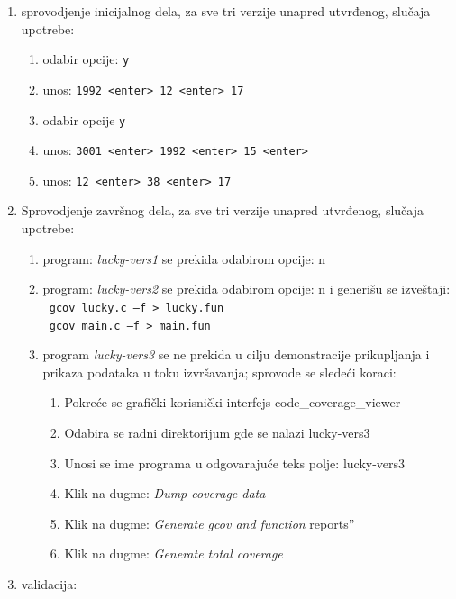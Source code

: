 \documentclass[12pt,oneside]{memoir}
\newcommand{\kod}[1]{\texttt{#1}}
\newcommand{\strano}[1]{\textit{#1}}
\begin{document}
\begin{enumerate}
\item sprovodjenje inicijalnog dela, za sve tri verzije unapred utvrđenog, slučaja upotrebe:
\begin{enumerate}
\item odabir opcije: \kod{y}
\item unos: \kod{1992 <enter> 12 <enter> 17}
\item odabir opcije \kod{y}
\item unos: \kod{3001 <enter> 1992 <enter> 15 <enter>}
\item unos: \kod{12  <enter> 38 <enter> 17}
\end{enumerate}
\item Sprovodjenje završnog dela, za sve tri verzije unapred utvrđenog, slučaja upotrebe:
\begin{enumerate}
\item program: \strano{lucky-vers1} se prekida odabirom opcije: n
\item program: \strano{lucky-vers2} se prekida odabirom opcije: n i generišu se izveštaji: \\
\kod{ gcov lucky.c –f  > lucky.fun} \\
\kod{ gcov main.c –f  > main.fun}
\item program \strano{lucky-vers3} se ne prekida u cilju demonstracije prikupljanja i prikaza podataka u toku izvršavanja; sprovode se sledeći koraci:
\begin{enumerate}
\item Pokreće se grafički korisnički interfejs code\_coverage\_viewer
\item Odabira se radni direktorijum gde se nalazi lucky-vers3
\item Unosi se ime programa u odgovarajuće teks polje: lucky-vers3
\item Klik na dugme: \strano{Dump coverage data}
\item Klik na dugme: \strano{Generate gcov and function} reports”
\item Klik na dugme: \strano{Generate total coverage}
\end{enumerate}
\end{enumerate}
\item validacija: 
\begin{enumerate}


\end{enumerate}
\end{enumerate}
\end{document}
